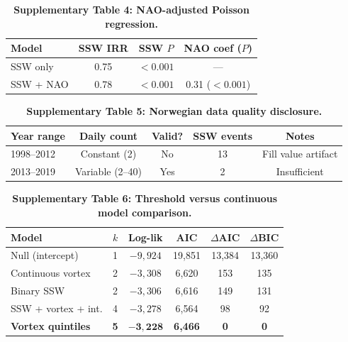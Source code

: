 \documentclass[11pt,letterpaper]{article}
\begin{document}
\begin{table}[!ht]
\centering
\caption{\textbf{Supplementary Table 4: NAO-adjusted Poisson regression.}}
\label{stab:nao}
\small
\begin{tabular}{lccc}
\toprule
Model & SSW IRR & SSW $P$ & NAO coef ($P$) \\
\midrule
SSW only & 0.75 & $< 0.001$ & --- \\
SSW + NAO & 0.78 & $< 0.001$ & 0.31 ($< 0.001$) \\
\bottomrule
\end{tabular}
\end{table}

\begin{table}[!ht]
\centering
\caption{\textbf{Supplementary Table 5: Norwegian data quality disclosure.}}
\label{stab:norway_quality}
\small
\begin{tabular}{lcccc}
\toprule
Year range & Daily count & Valid? & SSW events & Notes \\
\midrule
1998--2012 & Constant (2) & No & 13 & Fill value artifact \\
2013--2019 & Variable (2--40) & Yes & 2 & Insufficient \\
\bottomrule
\end{tabular}
\end{table}

\begin{table}[!ht]
\centering
\caption{\textbf{Supplementary Table 6: Threshold versus continuous model comparison.}}
\label{stab:model}
\small
\begin{tabular}{lccccc}
\toprule
Model & $k$ & Log-lik & AIC & $\Delta$AIC & $\Delta$BIC \\
\midrule
Null (intercept) & 1 & $-9{,}924$ & 19,851 & 13,384 & 13,360 \\
Continuous vortex & 2 & $-3{,}308$ & 6,620 & 153 & 135 \\
Binary SSW & 2 & $-3{,}306$ & 6,616 & 149 & 131 \\
SSW + vortex + int. & 4 & $-3{,}278$ & 6,564 & 98 & 92 \\
\textbf{Vortex quintiles} & \textbf{5} & $\mathbf{-3{,}228}$ & \textbf{6,466} & \textbf{0} & \textbf{0} \\
\bottomrule
\end{tabular}
\end{table}
\end{document}
